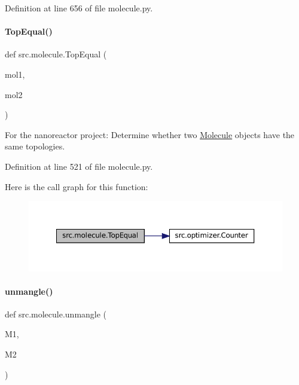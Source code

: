 Definition at line 656 of file molecule.\+py.

\mbox{\label{namespacesrc_1_1molecule_af3d73b03a8dc403bb7372b8f83f88245}} 
\paragraph{\texorpdfstring{Top\+Equal()}{TopEqual()}}
{\footnotesize\ttfamily def src.\+molecule.\+Top\+Equal (\begin{DoxyParamCaption}\item[{}]{mol1,  }\item[{}]{mol2 }\end{DoxyParamCaption})}



For the nanoreactor project\+: Determine whether two \hyperlink{classsrc_1_1molecule_1_1Molecule}{Molecule} objects have the same topologies. 



Definition at line 521 of file molecule.\+py.

Here is the call graph for this function\+:
\nopagebreak
\begin{figure}[H]
\begin{center}
\leavevmode
\includegraphics[width=350pt]{namespacesrc_1_1molecule_af3d73b03a8dc403bb7372b8f83f88245_cgraph}
\end{center}
\end{figure}
\mbox{\label{namespacesrc_1_1molecule_a784faffc34b87c6f72db0f4915e1a355}} 
\paragraph{\texorpdfstring{unmangle()}{unmangle()}}
{\footnotesize\ttfamily def src.\+molecule.\+unmangle (\begin{DoxyParamCaption}\item[{}]{M1,  }\item[{}]{M2 }\end{DoxyParamCaption})}



